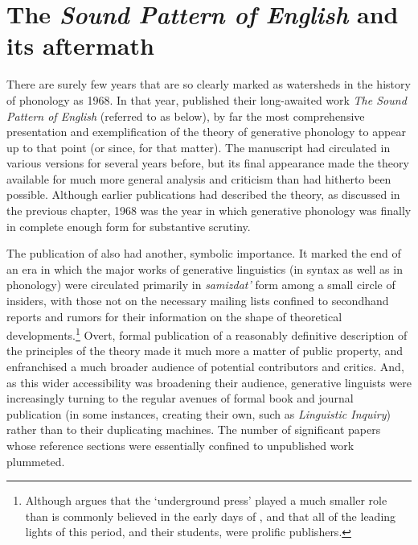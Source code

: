 \chapter{The \textsl{Sound Pattern of English} and its aftermath}
\label{ch.spe}

There are surely few years that are so clearly marked as watersheds in
the history of phonology as 1968. In that year, \citeauthor{spe}
published their long-awaited work \textsl{The Sound Pattern of
  English} (referred to as \textsl{} below), by far the most
comprehensive presentation and exemplification of the theory of
generative phonology to appear up to that point (or since, for that
matter). The manuscript had circulated in various versions for several
years before, but its final appearance made the theory available for
much more general analysis and criticism than had hitherto been
possible. Although earlier publications had described the theory, as
discussed in the previous chapter, 1968 was the year in which
generative phonology was finally in complete enough form for
substantive scrutiny.

The publication of \textsl{} also had another, symbolic
importance. It marked the end of an era in which the major works of
generative linguistics (in syntax as well as in phonology) were
circulated primarily in \emph{samizdat'} form among a small circle of
insiders, with those not on the necessary mailing lists confined to
secondhand reports and rumors for their information on the shape of
theoretical developments.\footnote{Although
  \citet[ch. 5]{newmeyer22:ailt} argues that the ‘underground press’
  played a much smaller role than is commonly believed in the early
  days of , and that all of the leading lights of
  this period, and their students, were prolific publishers.} Overt,
formal publication of a reasonably definitive description of the
principles of the theory made it much more a matter of public
property, and enfranchised a much broader audience of potential
contributors and critics. And, as this wider accessibility was
broadening their audience, generative linguists were increasingly
turning to the {regular} avenues of formal book and journal publication
(in some instances, creating their own, such as \textsl{Linguistic
  Inquiry}) rather than to their duplicating machines. The number of
significant papers whose reference sections were essentially confined
to unpublished work plummeted.

